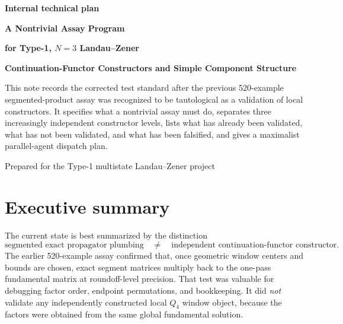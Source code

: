 \documentclass[11pt]{article}
\begin{document}
\begin{titlepage}
\thispagestyle{empty}
\centering
\vspace*{1.0cm}
{\Large\color{AccentBlue}\bfseries Internal technical plan\par}
\vspace{0.6cm}
{\fontsize{23}{28}\selectfont\bfseries\color{TitleBlue}A Nontrivial Assay Program\par}
{\fontsize{22}{27}\selectfont\bfseries\color{TitleBlue}for Type-1, $N=3$ Landau--Zener\par}
\vspace{0.15cm}
{\fontsize{18}{23}\selectfont\bfseries\color{TitleBlue}Continuation-Functor Constructors and Simple Component Structure\par}
\vspace{0.9cm}
\begin{minipage}{0.88\textwidth}
\small
This note records the corrected test standard after the previous 520-example segmented-product assay was recognized to be tautological as a validation of local constructors. It specifies what a nontrivial assay must do, separates three increasingly independent constructor levels, lists what has already been validated, what has not been validated, and what has been falsified, and gives a maximalist parallel-agent dispatch plan.
\end{minipage}
\vfill
{\large\color{MutedText}Prepared for the Type-1 multistate Landau--Zener project\par}
\end{titlepage}

\tableofcontents
\clearpage

\section{Executive summary}

The current state is best summarized by the distinction
\[
\boxed{\text{segmented exact propagator plumbing}}\quad \neq \quad \boxed{\text{independent continuation-functor constructor}.}
\]
The earlier 520-example assay confirmed that, once geometric window centers and bounds are chosen, exact segment matrices multiply back to the one-pass fundamental matrix at roundoff-level precision. That test was valuable for debugging factor order, endpoint permutations, and bookkeeping. It did \emph{not} validate any independently constructed local $Q_4$ window object, because the factors were obtained from the same global fundamental solution.
\end{document}
